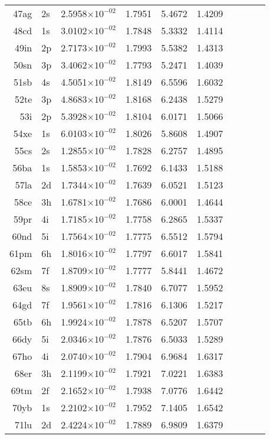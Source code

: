 \documentclass[12pt]{book}
\begin{document}
\begin{center}
\begin{longtable}{r l l l l l l l l l}
	47ag	&	2s	&	2.5958$\times10^{-02}$	&	1.7951	&	5.4672	&	1.4209 \\
	48cd	&	1s	&	3.0102$\times10^{-02}$	&	1.7848	&	5.3332	&	1.4114 \\
	49in	&	2p	&	2.7173$\times10^{-02}$	&	1.7993	&	5.5382	&	1.4313 \\
	50sn	&	3p	&	3.4062$\times10^{-02}$	&	1.7793	&	5.2471	&	1.4039 \\
	51sb	&	4s	&	4.5051$\times10^{-02}$	&	1.8149	&	6.5596	&	1.6032 \\
	52te	&	3p	&	4.8683$\times10^{-02}$	&	1.8168	&	6.2438	&	1.5279 \\
	53i	&	2p	&	5.3928$\times10^{-02}$	&	1.8104	&	6.0171	&	1.5066 \\
	54xe	&	1s	&	6.0103$\times10^{-02}$	&	1.8026	&	5.8608	&	1.4907 \\
	55cs	&	2s	&	1.2855$\times10^{-02}$	&	1.7828	&	6.2757	&	1.4895 \\
	56ba	&	1s	&	1.5853$\times10^{-02}$	&	1.7692	&	6.1433	&	1.5188 \\
	57la	&	2d	&	1.7344$\times10^{-02}$	&	1.7639	&	6.0521	&	1.5123 \\
	58ce	&	3h	&	1.6781$\times10^{-02}$	&	1.7686	&	6.0001	&	1.4644 \\
	59pr	&	4i	&	1.7185$\times10^{-02}$	&	1.7758	&	6.2865	&	1.5337 \\
	60nd	&	5i	&	1.7564$\times10^{-02}$	&	1.7775	&	6.5512	&	1.5794 \\
	61pm&	6h	&	1.8016$\times10^{-02}$	&	1.7797	&	6.6017	&	1.5841 \\
	62sm&	7f	&	1.8709$\times10^{-02}$	&	1.7777	&	5.8441	&	1.4672 \\
	63eu	&	8s	&	1.8909$\times10^{-02}$	&	1.7840	&	6.7077	&	1.5952 \\
	64gd	&	7f	&	1.9561$\times10^{-02}$	&	1.7816	&	6.1306	&	1.5217 \\
	65tb	&	6h	&	1.9924$\times10^{-02}$	&	1.7878	&	6.5207	&	1.5707 \\
	66dy	&	5i	&	2.0346$\times10^{-02}$	&	1.7876	&	6.5033	&	1.5289 \\
	67ho	&	4i	&	2.0740$\times10^{-02}$	&	1.7904	&	6.9684	&	1.6317 \\
	68er	&	3h	&	2.1199$\times10^{-02}$	&	1.7921	&	7.0221	&	1.6383 \\
	69tm	&	2f	&	2.1652$\times10^{-02}$	&	1.7938	&	7.0776	&	1.6442 \\
	70yb	&	1s	&	2.2102$\times10^{-02}$	&	1.7952	&	7.1405	&	1.6542 \\
	71lu	&	2d	&	2.4224$\times10^{-02}$	&	1.7889	&	6.9809	&	1.6379 \\

\end{longtable}
\end{center}
\end{document}
